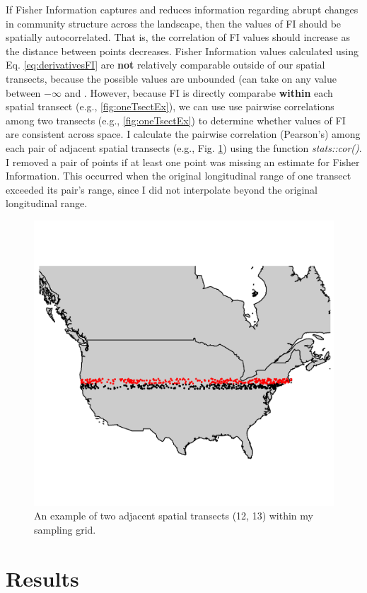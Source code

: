 \documentclass[12pt,twoside,openany]{reedthesis}
\begin{document}
If Fisher Information captures and reduces information regarding abrupt changes in community structure across the landscape, then the values of FI should be spatially autocorrelated. That is, the correlation of FI values should increase as the distance between points decreases. Fisher Information values calculated using Eq. \eqref{eq:derivativesFI} are \textbf{not} relatively comparable outside of our spatial transects, because the possible values are unbounded (can take on any value between \(-\infty\) and \(%
\). However, because FI is directly comparabe \textbf{within} each spatial transect (e.g., \ref{fig:oneTsectEx}), we can use use pairwise correlations among two transects (e.g., \ref{fig:oneTsectEx}) to determine whether values of FI are consistent across space. I calculate the pairwise correlation (Pearson's) among each pair of adjacent spatial transects (e.g., Fig. \ref{fig:adjacentTsectEx}) using the function \emph{stats::cor()}. I removed a pair of points if at least one point was missing an estimate for Fisher Information. This occurred when the original longitudinal range of one transect exceeded its pair's range, since I did not interpolate beyond the original longitudinal range.
\begin{figure}[h]

{\centering \includegraphics[width=0.85\linewidth]{./chapterFiles/fisherSpatial/figures/figsCalledInDiss/transectSamplingEx_2rows} 

}

\caption{An example of two adjacent spatial transects (12, 13) within my sampling grid.}\label{fig:adjacentTsectEx}
\end{figure}
\hypertarget{results-1}{%
\section{Results}\label{results-1}}
\end{document}

